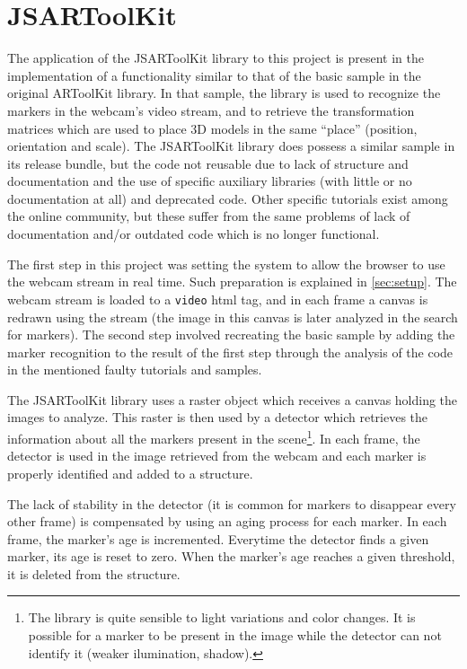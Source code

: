 \section{JSARToolKit}
\label{sec:jsartoolkit}

The application of the JSARToolKit library to this project is present in the implementation of a functionality similar to that of the basic sample in the original ARToolKit library. In that sample, the library is used to recognize the markers in the webcam's video stream, and to retrieve the transformation matrices which are used to place 3D models in the same ``place'' (position, orientation and scale). The JSARToolKit library does possess a similar sample in its release bundle, but the code not reusable due to lack of structure and documentation and the use of specific auxiliary libraries (with little or no documentation at all) and deprecated code. Other specific tutorials exist among the online community, but these suffer from the same problems of lack of documentation and/or outdated code which is no longer functional.

The first step in this project was setting the system to allow the browser to use the webcam stream in real time. Such preparation is explained in \cref{sec:setup}. The webcam stream is loaded to a \texttt{video} html tag, and in each frame a canvas is redrawn using the stream (the image in this canvas is later analyzed in the search for markers). The second step involved recreating the basic sample by adding the marker recognition to the result of the first step through the analysis of the code in the mentioned faulty tutorials and samples.

The JSARToolKit library uses a raster object which receives a canvas holding the images to analyze. This raster is then used by a detector which retrieves the information about all the markers present in the scene\footnote{The library is quite sensible to light variations and color changes. It is possible for a marker to be present in the image while the detector can not identify it (weaker ilumination, shadow).}. In each frame, the detector is used in the image retrieved from the webcam and each marker is properly identified and added to a structure.

The lack of stability in the detector (it is common for markers to disappear every other frame) is compensated by using an aging process for each marker. In each frame, the marker's age is incremented. Everytime the detector finds a given marker, its age is reset to zero. When the marker's age reaches a given threshold, it is deleted from the structure.

